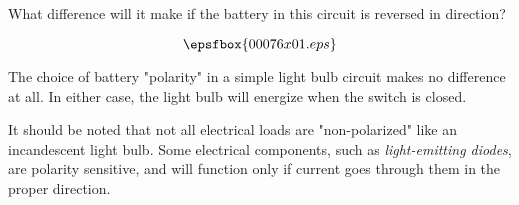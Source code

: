 

What difference will it make if the battery in this circuit is reversed in direction?

$$\epsfbox{00076x01.eps}$$







The choice of battery "polarity" in a simple light bulb circuit makes no difference at all.  In either case, the light bulb will energize when the switch is closed.







It should be noted that not all electrical loads are "non-polarized" like an incandescent light bulb.  Some electrical components, such as {\it light-emitting diodes}, are polarity sensitive, and will function only if current goes through them in the proper direction.




